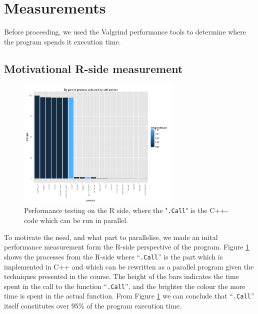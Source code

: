 

\section{Measurements}

Before proceeding, we used the Valgrind performance tools to determine
where the program spends it execution time.

\subsection{Motivational R-side measurement}

\begin{figure}[!htbp] \centering
  \includegraphics[width=0.7\textwidth]{images/parentColByPortion.pdf}
  \caption{Performance testing on the R side, where the "\texttt{.Call}" is the
C++-code which can be run in parallel.}
  \label{fig:rMot}
\end{figure}

To motivate the need, and what part to parallelise, we made an inital
performance measurement form the R-side perspective of the
program. Figure \ref{fig:rMot} shows the processes from the R-side
where ``\texttt{.Call}'' is the part which is implemented in C++ and which can
be rewritten as a parallel program given the techniques presented in
the course. The height of the bars indicates the time spent in the
call to the function ``\texttt{.Call}'', and the brighter the colour the more
time is spent in the actual function. From Figure \ref{fig:rMot} we
can conclude that ``\texttt{.Call}'' itself constitutes over 95\% of the
program execution time.

